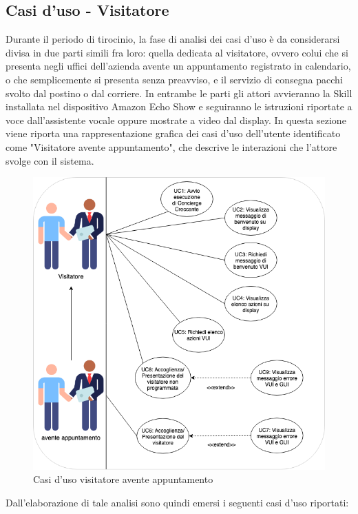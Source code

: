\subsection{Casi d'uso - Visitatore}
Durante il periodo di tirocinio, la fase di analisi dei casi d'uso è da considerarsi divisa in due parti simili fra loro: quella dedicata al visitatore, ovvero colui che si presenta negli uffici dell'azienda avente un appuntamento registrato in calendario, o che semplicemente si presenta senza preavviso, e il servizio di consegna pacchi svolto dal postino o dal corriere. In entrambe le parti gli attori avvieranno la Skill installata nel dispositivo Amazon Echo Show e seguiranno le istruzioni riportate a voce dall'assistente vocale oppure mostrate a video dal display. In questa sezione viene riporta una rappresentazione grafica dei casi d'uso dell'utente identificato come "Visitatore avente appuntamento", che descrive le interazioni che l'attore svolge con il sistema.  
\begin{figure}[H] 
    \centering 
    \includegraphics[width=1\columnwidth]{immagini/casi_duso1.png}
    \caption{\label{fig:casi_duso_visitatore}Casi d'uso visitatore avente appuntamento}
\end{figure}
Dall'elaborazione di tale analisi sono quindi emersi i seguenti casi d'uso riportati:
